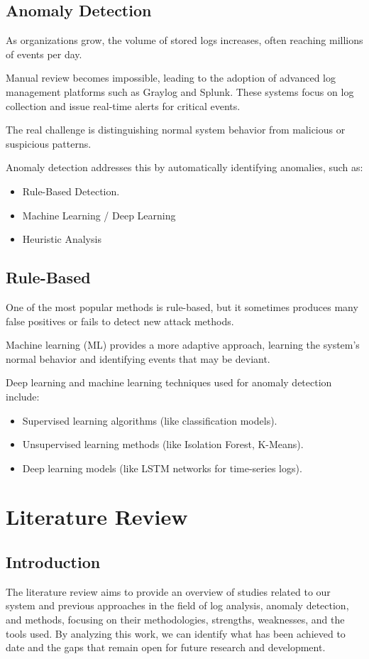 \documentclass[12pt,a4paper]{report} %
\begin{document}
\subsection{Anomaly Detection}
As organizations grow, the volume of stored logs increases, often reaching millions of events per day.

Manual review becomes impossible, leading to the adoption of advanced log management platforms such as Graylog and Splunk. These systems focus on log collection and issue real-time alerts for critical events.

The real challenge is distinguishing normal system behavior from malicious or suspicious patterns.

Anomaly detection addresses this by automatically identifying anomalies, such as:

\begin{itemize}[leftmargin=*]
    \item Rule-Based Detection.
    \item Machine Learning / Deep Learning
    \item Heuristic Analysis
\end{itemize}

\subsection{Rule-Based}
One of the most popular methods is rule-based, but it sometimes produces many false positives or fails to detect new attack methods.

Machine learning (ML) provides a more adaptive approach, learning the system's normal behavior and identifying events that may be deviant.

Deep learning and machine learning techniques used for anomaly detection include:
\begin{itemize}[leftmargin=*]
    \item Supervised learning algorithms (like classification models).
    \item Unsupervised learning methods (like Isolation Forest, K-Means).
    \item Deep learning models (like LSTM networks for time-series logs).
\end{itemize}

\section{Literature Review}
\subsection{Introduction}
The literature review aims to provide an overview of studies related to our system and previous approaches in the field of log analysis, anomaly detection, and methods, focusing on their methodologies, strengths, weaknesses, and the tools used.
By analyzing this work, we can identify what has been achieved to date and the gaps that remain open for future research and development.
\end{document}
